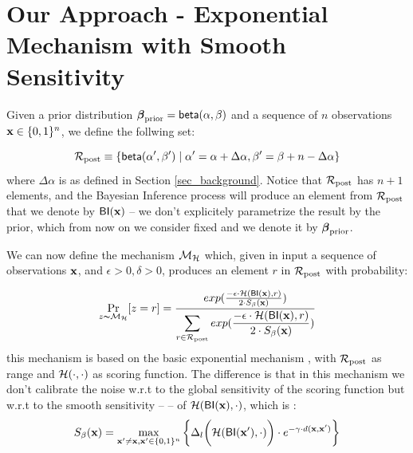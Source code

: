\documentclass[sigconf, anonymous]{acmart}
\begin{document}

\section{Our Approach - Exponential Mechanism with Smooth Sensitivity}
\label{sec_smoo}
Given a prior distribution $\boldsymbol{\beta}_{\textup{prior}}=\mathsf{beta}(\alpha, \beta)$ and a sequence of $n$ observations $\textbf{x}\in\{0,1\}^n$,
we define the follwing set:

\[
  \mathcal{R}_{\textup{post}}\equiv\{\mathsf{beta}(\alpha',\beta')\mid \alpha'=\alpha+\Delta\alpha, \beta'=\beta+n-\Delta\alpha\}
\]
where $\Delta\alpha$ is as defined in Section \ref{sec_background}.
Notice that $\mathcal{R}_{\textup{post}}$ has $n + 1$ elements, and the Bayesian Inference
process will produce an element from $\mathcal{R}_{\textup{post}}$ that we denote by
$\mathsf{BI}(\textbf{x})$ -- we don't explicitely parametrize the result by the
prior,  which from now on we consider fixed and we denote it by $\boldsymbol{\beta}_{\textup{prior}}$.


We can now define the mechanism $\mathcal{M}_{\mathcal{H}}$ which,
given in input a sequence of observations $\textbf{x}$, and $\epsilon>0, \delta>0$,
produces an element $r$ in $\mathcal{R}_{\textup{post}}$ with probability: 

\begin{equation*}
\underset{z \thicksim \mathcal{M}_{\mathcal{H}}}{\Pr}[z=r] = \frac {exp(\frac{-\epsilon\cdot\mathcal{H}(\mathsf{BI}(\textbf{x}),r)}{2\cdot S_\beta(\textbf{x})})}
{\displaystyle\sum_{r\in\mathcal{R}_{\textup{post}}} exp(\frac{-\epsilon\cdot\mathcal{H}(\mathsf{BI}(\textbf{x}),r)}{2\cdot S_{\beta}(\textbf{x})})}
\end{equation*}
this mechanism is based on the basic exponential mechanism \cite{talwar}, with $\mathcal{R}_{\textup{post}}$ as range and $\mathcal{H}(\cdot,\cdot)$ as scoring function.
The difference is that in this mechanism we don't calibrate the noise w.r.t to the global sensitivity of the scoring function but w.r.t to the smooth sensitivity
-- \citet{nissim2007smooth}-- of $\mathcal{H}(\mathsf{BI}(\textbf{x}), \cdot)$, which is :
\[
   S_{\beta}(\textbf{x})=\max_{\textbf{x}' \neq \textbf{x}, \textbf{x}' \in \{0,1\}^{n}}\bigg \{\Delta_{l}\bigg (\mathcal{H}(\mathsf{BI}(\textbf{x}'),\cdot)\bigg )\cdot e^{-\gamma\cdot d(\textbf{x}, \textbf{x}')}\bigg\}
 \]
\end{document}
